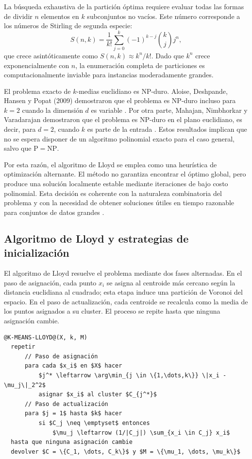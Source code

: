 \documentclass[11pt,letterpaper]{article}
\numberwithin{equation}{section}
\newcommand{\Pclase}{\mathrm{P}}
\newcommand{\NPclase}{\mathrm{NP}}
\theoremstyle{plain}
\begin{document}
La búsqueda exhaustiva de la partición óptima requiere evaluar todas las formas de dividir $n$ elementos en $k$ subconjuntos no vacíos. Este número corresponde a los números de Stirling de segunda especie:
\begin{equation}
S(n,k) = \frac{1}{k!} \sum_{j=0}^{k} (-1)^{k-j} \binom{k}{j} j^n,
\end{equation}
que crece asintóticamente como $S(n,k) \approx k^n / k!$. Dado que $k^n$ crece exponencialmente con $n$, la enumeración completa de particiones es computacionalmente inviable para instancias moderadamente grandes.

El problema exacto de $k$-medias euclidiano es NP-duro. Aloise, Deshpande, Hansen y Popat (2009) demostraron que el problema es NP-duro incluso para $k=2$ cuando la dimensión $d$ es variable \citep{aloise2009}. Por otra parte, Mahajan, Nimbhorkar y Varadarajan demostraron que el problema es NP-duro en el plano euclidiano, es decir, para $d=2$, cuando $k$ es parte de la entrada \citep{mahajan2012}. Estos resultados implican que no se espera disponer de un algoritmo polinomial exacto para el caso general, salvo que $\Pclase = \NPclase$.

Por esta razón, el algoritmo de Lloyd se emplea como una heurística de optimización alternante. El método no garantiza encontrar el óptimo global, pero produce una solución localmente estable mediante iteraciones de bajo costo polinomial. Esta decisión es coherente con la naturaleza combinatoria del problema y con la necesidad de obtener soluciones útiles en tiempo razonable para conjuntos de datos grandes \citep{cormen2022,aloise2009,mahajan2012}.

\subsection{Algoritmo de Lloyd y estrategias de inicialización}

El algoritmo de Lloyd \citep{lloyd1982} resuelve el problema mediante dos fases alternadas. En el paso de asignación, cada punto $x_i$ se asigna al centroide más cercano según la distancia euclidiana al cuadrado; esta etapa induce una partición de Voronoi del espacio. En el paso de actualización, cada centroide se recalcula como la media de los puntos asignados a su cluster. El proceso se repite hasta que ninguna asignación cambie.

\begin{lstlisting}[caption={Algoritmo de Lloyd para K-Means},label={alg:lloyd}]
@K-MEANS-LLOYD@(X, k, M)
  repetir
      // Paso de asignación
      para cada $x_i$ en $X$ hacer
          $j^* \leftarrow \arg\min_{j \in \{1,\dots,k\}} \|x_i - \mu_j\|_2^2$
          asignar $x_i$ al cluster $C_{j^*}$
      // Paso de actualización
      para $j = 1$ hasta $k$ hacer
          si $C_j \neq \emptyset$ entonces
              $\mu_j \leftarrow (1/|C_j|) \sum_{x_i \in C_j} x_i$
  hasta que ninguna asignación cambie
  devolver $C = \{C_1, \dots, C_k\}$ y $M = \{\mu_1, \dots, \mu_k\}$
\end{lstlisting}
\end{document}
